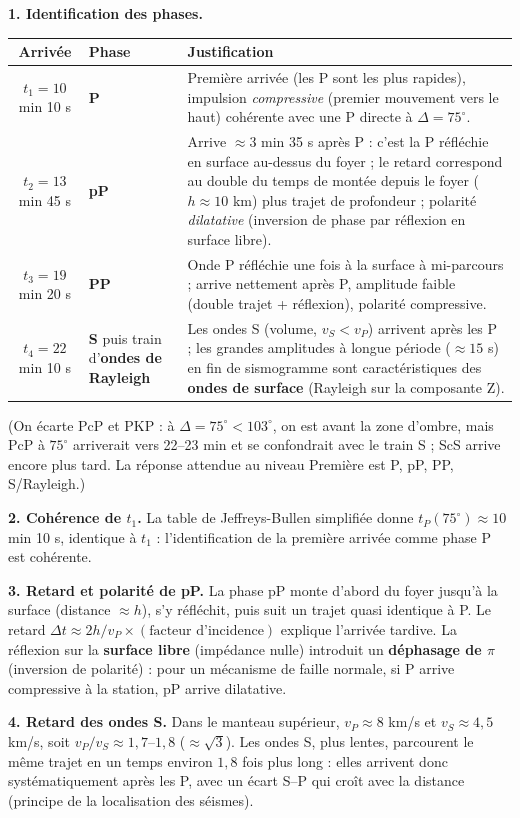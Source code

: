 \documentclass[11pt]{article}
\begin{document}
\begin{corrige}
\textbf{1. Identification des phases.}

\begin{center}
\begin{tabularx}{\linewidth}{|c|l|X|}\hline
\rowcolor{popblueL} Arrivée & Phase & Justification \\ \hline
$t_1 = 10$ min 10 s & \textbf{P} & Première arrivée (les P sont les plus rapides), impulsion \emph{compressive} (premier mouvement vers le haut) cohérente avec une P directe à $\Delta = 75^\circ$. \\ \hline
$t_2 = 13$ min 45 s & \textbf{pP} & Arrive $\approx 3$ min 35 s après P : c'est la P réfléchie en surface au-dessus du foyer ; le retard correspond au double du temps de montée depuis le foyer ($h \approx 10$ km) plus trajet de profondeur ; polarité \emph{dilatative} (inversion de phase par réflexion en surface libre). \\ \hline
$t_3 = 19$ min 20 s & \textbf{PP} & Onde P réfléchie une fois à la surface à mi-parcours ; arrive nettement après P, amplitude faible (double trajet + réflexion), polarité compressive. \\ \hline
$t_4 = 22$ min 10 s & \textbf{S} puis train d'\textbf{ondes de Rayleigh} & Les ondes S (volume, $v_S < v_P$) arrivent après les P ; les grandes amplitudes à longue période ($\approx 15$ s) en fin de sismogramme sont caractéristiques des \textbf{ondes de surface} (Rayleigh sur la composante Z). \\ \hline
\end{tabularx}
\end{center}

(On écarte PcP et PKP : à $\Delta = 75^\circ < 103^\circ$, on est avant la zone d'ombre, mais PcP à $75^\circ$ arriverait vers 22--23 min et se confondrait avec le train S ; ScS arrive encore plus tard. La réponse attendue au niveau Première est P, pP, PP, S/Rayleigh.)

\textbf{2. Cohérence de $t_1$.} La table de Jeffreys-Bullen simplifiée donne $t_P(75^\circ) \approx 10$ min 10 s, identique à $t_1$ : l'identification de la première arrivée comme phase P est cohérente.

\textbf{3. Retard et polarité de pP.} La phase pP monte d'abord du foyer jusqu'à la surface (distance $\approx h$), s'y réfléchit, puis suit un trajet quasi identique à P. Le retard $\Delta t \approx 2h / v_P \times (\text{facteur d'incidence})$ explique l'arrivée tardive. La réflexion sur la \textbf{surface libre} (impédance nulle) introduit un \textbf{déphasage de $\pi$} (inversion de polarité) : pour un mécanisme de faille normale, si P arrive compressive à la station, pP arrive dilatative.

\textbf{4. Retard des ondes S.} Dans le manteau supérieur, $v_P \approx 8$ km/s et $v_S \approx 4,5$ km/s, soit $v_P / v_S \approx 1{,}7$--$1{,}8$ ($\approx \sqrt{3}$). Les ondes S, plus lentes, parcourent le même trajet en un temps environ $1{,}8$ fois plus long : elles arrivent donc systématiquement après les P, avec un écart S--P qui croît avec la distance (principe de la localisation des séismes).
\end{corrige}
\end{document}

